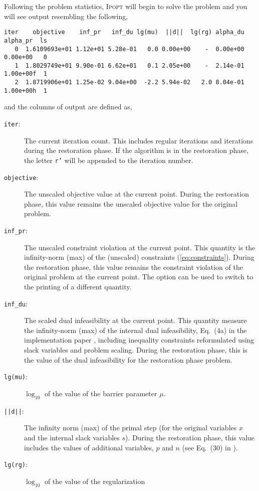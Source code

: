 \documentclass[10pt]{article}
\newcommand{\Ipopt}{\textsc{Ipopt}\xspace}
\begin{document}
Following the problem statistics, \Ipopt will begin to solve the
problem and you will see output resembling the following,
\begin{verbatim}
iter    objective    inf_pr   inf_du lg(mu)  ||d||  lg(rg) alpha_du alpha_pr  ls
   0  1.6109693e+01 1.12e+01 5.28e-01   0.0 0.00e+00    -  0.00e+00 0.00e+00   0
   1  1.8029749e+01 9.90e-01 6.62e+01   0.1 2.05e+00    -  2.14e-01 1.00e+00f  1
   2  1.8719906e+01 1.25e-02 9.04e+00  -2.2 5.94e-02   2.0 8.04e-01 1.00e+00h  1
\end{verbatim}
and the columns of output are defined as,
\begin{description}
\item[{\tt iter}:] The current iteration count. This includes regular
  iterations and iterations during the restoration phase. If the
  algorithm is in the restoration phase, the letter {\tt r'} will be
  appended to the iteration number.
\item[{\tt objective}:] The unscaled objective value at the current
  point. During the restoration phase, this value remains the unscaled
  objective value for the original problem.
\item[{\tt inf\_pr}:] The unscaled constraint violation at the current
  point.  This quantity is the infinity-norm (max) of the (unscaled)
  constraints (\ref{eq:constraints}).  During the restoration phase,
  this value remains the constraint violation of the original problem
  at the current point.  The option  can
  be used to switch to the printing of a different quantity.
\item[{\tt inf\_du}:] The scaled dual infeasibility at the current
  point.  This quantity measure the infinity-norm (max) of the
  internal dual infeasibility, Eq.~(4a) in the implementation paper
  \cite{WaecBieg06:mp}, including inequality constraints reformulated
  using slack variables and problem scaling. During the restoration
  phase, this is the value of the dual infeasibility for the
  restoration phase problem.
\item[{\tt lg(mu)}:] $\log_{10}$ of the value of the barrier parameter
  $\mu$.
\item[{\tt ||d||}:] The infinity norm (max) of the primal step (for
  the original variables $x$ and the internal slack variables $s$).
  During the restoration phase, this value includes the values of
  additional variables, $p$ and $n$ (see Eq.~(30) in
  \cite{WaecBieg06:mp}).
\item[{\tt lg(rg)}:] $\log_{10}$ of the value of the regularization

\end{description}
\end{document}
